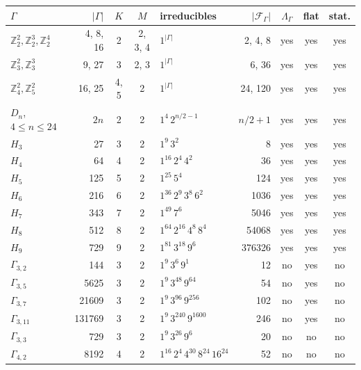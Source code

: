 \documentclass[12pt]{amsart}
\theoremstyle{definition}
\begin{document}
\vspace{4mm}

\begin{center}
\small
\renewcommand{\arraystretch}{1.2}
\begin{tabular}{|l|r|c|c|l|r|c|c|c|}
\hline
$\Gamma$&$|\Gamma|$&$K$&$M$&irreducibles&$|\mathcal F_\Gamma|$&$\Lambda_\Gamma$&flat&stat.\\
\hline
$\mathbb Z_2^2,\mathbb Z_2^3,\mathbb Z_2^4$&4, 8, 16&2&2, 3, 4&$1^{|\Gamma|}$&2, 4, 8&yes&yes&yes\\
$\mathbb Z_3^2,\mathbb Z_3^3$&9, 27&3&2, 3&$1^{|\Gamma|}$&6, 36&yes&yes&yes\\
$\mathbb Z_4^2,\mathbb Z_5^2$&16, 25&4, 5&2&$1^{|\Gamma|}$&24, 120&yes&yes&yes\\
$D_n$, $4\leq n\leq24$&$2n$&2&2&$1^4\,2^{n/2-1}$&$n/2+1$&yes&yes&yes\\
$H_3$&27&3&2&$1^9\,3^2$&8&yes&yes&yes\\
$H_4$&64&4&2&$1^{16}\,2^4\,4^2$&36&yes&yes&yes\\
$H_5$&125&5&2&$1^{25}\,5^4$&124&yes&yes&yes\\
$H_6$&216&6&2&$1^{36}\,2^9\,3^8\,6^2$&1036&yes&yes&yes\\
$H_7$&343&7&2&$1^{49}\,7^6$&5046&yes&yes&yes\\
$H_8$&512&8&2&$1^{64}\,2^{16}\,4^8\,8^4$&54068&yes&yes&yes\\
$H_9$&729&9&2&$1^{81}\,3^{18}\,9^6$&376326&yes&yes&yes\\
$\Gamma_{3,2}$&144&3&2&$1^9\,3^6\,9^1$&12&no&yes&no\\
$\Gamma_{3,5}$&5625&3&2&$1^9\,3^{48}\,9^{64}$&54&no&yes&no\\
$\Gamma_{3,7}$&21609&3&2&$1^9\,3^{96}\,9^{256}$&102&no&yes&no\\
$\Gamma_{3,11}$&131769&3&2&$1^9\,3^{240}\,9^{1600}$&246&no&yes&no\\
$\Gamma_{3,3}$&729&3&2&$1^9\,3^{26}\,9^6$&20&no&no&no\\
$\Gamma_{4,2}$&8192&4&2&$1^{16}\,2^4\,4^{30}\,8^{24}\,16^{24}$&52&no&no&no\\
\hline
\end{tabular}
\end{center}

\bigskip
\end{document}
